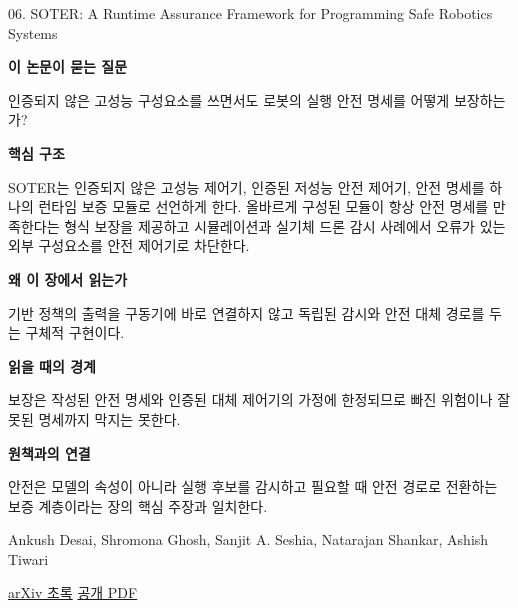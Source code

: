 \documentclass[11pt,openany]{book}
\begin{document}
\begin{termcard}{06. SOTER: A Runtime Assurance Framework for Programming Safe Robotics Systems}

\par

\medskip

{\sffamily\bfseries\color{deepblue} 이 논문이 묻는 질문}\par

인증되지 않은 고성능 구성요소를 쓰면서도 로봇의 실행 안전 명세를 어떻게 보장하는가?

\smallskip

{\sffamily\bfseries\color{deepblue} 핵심 구조}\par

SOTER는 인증되지 않은 고성능 제어기, 인증된 저성능 안전 제어기, 안전 명세를 하나의 런타임 보증 모듈로 선언하게 한다. 올바르게 구성된 모듈이 항상 안전 명세를 만족한다는 형식 보장을 제공하고 시뮬레이션과 실기체 드론 감시 사례에서 오류가 있는 외부 구성요소를 안전 제어기로 차단한다.

\smallskip

{\sffamily\bfseries\color{deepblue} 왜 이 장에서 읽는가}\par

기반 정책의 출력을 구동기에 바로 연결하지 않고 독립된 감시와 안전 대체 경로를 두는 구체적 구현이다.

\smallskip

{\sffamily\bfseries\color{coral} 읽을 때의 경계}\par

보장은 작성된 안전 명세와 인증된 대체 제어기의 가정에 한정되므로 빠진 위험이나 잘못된 명세까지 막지는 못한다.

\smallskip

{\sffamily\bfseries\color{teal} 원책과의 연결}\par

안전은 모델의 속성이 아니라 실행 후보를 감시하고 필요할 때 안전 경로로 전환하는 보증 계층이라는 장의 핵심 주장과 일치한다.

\medskip

{\footnotesize\color{muted} Ankush Desai, Shromona Ghosh, Sanjit A. Seshia, Natarajan Shankar, Ashish Tiwari\par

\href{https://arxiv.org/abs/1808.07921}{arXiv 초록} \quad \href{https://arxiv.org/pdf/1808.07921}{공개 PDF}\par}

\end{termcard}
\end{document}
